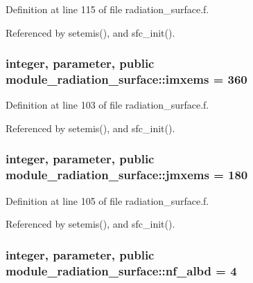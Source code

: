 Definition at line 115 of file radiation\+\_\+surface.\+f.



Referenced by setemis(), and sfc\+\_\+init().

\subsubsection[{\texorpdfstring{imxems}{imxems}}]{\setlength{\rightskip}{0pt plus 5cm}integer, parameter, public module\+\_\+radiation\+\_\+surface\+::imxems = 360}\hypertarget{group__module__radiation__surface_gaab4b9853c71ff40f8db2aa78b7cab265}{}\label{group__module__radiation__surface_gaab4b9853c71ff40f8db2aa78b7cab265}


Definition at line 103 of file radiation\+\_\+surface.\+f.



Referenced by setemis(), and sfc\+\_\+init().

\subsubsection[{\texorpdfstring{jmxems}{jmxems}}]{\setlength{\rightskip}{0pt plus 5cm}integer, parameter, public module\+\_\+radiation\+\_\+surface\+::jmxems = 180}\hypertarget{group__module__radiation__surface_ga3922674f1c727d517ba5b0f7f5093970}{}\label{group__module__radiation__surface_ga3922674f1c727d517ba5b0f7f5093970}


Definition at line 105 of file radiation\+\_\+surface.\+f.



Referenced by setemis(), and sfc\+\_\+init().

\subsubsection[{\texorpdfstring{nf\+\_\+albd}{nf_albd}}]{\setlength{\rightskip}{0pt plus 5cm}integer, parameter, public module\+\_\+radiation\+\_\+surface\+::nf\+\_\+albd = 4}\hypertarget{group__module__radiation__surface_gab7800982c900bd632ca74d5e7d2b5ab3}{}\label{group__module__radiation__surface_gab7800982c900bd632ca74d5e7d2b5ab3}



